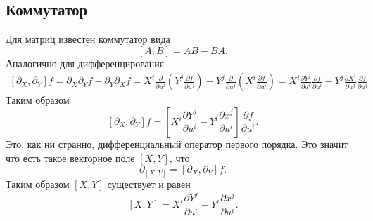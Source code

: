 \subsection{Коммутатор}

Для матриц известен коммутатор вида
$$
    \left[A, B\right] = AB - BA.
$$
Аналогично для дифференцирования
\begin{align*}
    \left[\partial_X, \partial_Y \right] f
    =
    \partial_X \partial_Y f - \partial_Y \partial_X f 
    =
    X^i \frac{\partial }{\partial u^i}
     \left(Y^j \frac{\partial f}{\partial u^j} \right)
    -
    Y^j \frac{\partial }{\partial u^j} 
    \left(X^i \frac{\partial f}{\partial u^i} \right) 
    = X^i \frac{\partial Y^j}{\partial u^i} \frac{\partial f}{\partial u^i} 
    -
    Y^j \frac{\partial X^i}{\partial u^j} \frac{\partial f}{\partial u^j}
\end{align*}
Таким образом
\begin{equation}
    \left[\partial_X, \partial_Y \right] f
    =
    \left[
        X^i \frac{\partial Y^j}{\partial u^i} - Y^i \frac{\partial x^j}{\partial u^i} 
    \right] \frac{\partial f}{\partial u^i} .
\end{equation}
Это, как ни странно, дифференциальный оператор первого порядка. Это значит что есть такое векторное поле $\left[X, Y\right]$, что
$$
    \partial_{\left[X, Y\right]} = \left[\partial_X, \partial_Y\right] f.
$$
Таким образом $\left[X, Y\right]$ существует и равен
\begin{equation}
    \left[X, Y\right] =   X^i \frac{\partial Y^j}{\partial u^i} - Y^i \frac{\partial x^j}{\partial u^i}.
\end{equation}
